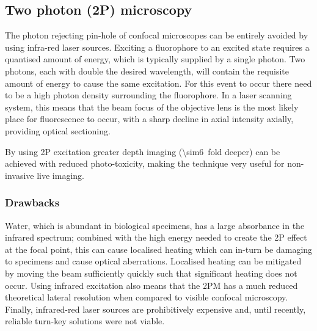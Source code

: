 %

\subsection{Two photon (2P) microscopy}


The photon rejecting pin-hole of confocal microscopes can be entirely avoided by using infra-red laser sources.
Exciting a fluorophore to an excited state requires a quantised amount of energy, which is typically supplied by a single photon.
Two photons, each with double the desired wavelength, will contain the requisite amount of energy to cause the same excitation.
For this event to occur there need to be a high photon density surrounding the fluorophore.
In a laser scanning system, this means that the beam focus of the \gls{objective lens} is the most likely place for fluorescence to occur, with a sharp decline in axial intensity axially, providing optical sectioning.

By using 2P excitation greater depth imaging (\SI{\sim6}{fold} deeper) can be achieved with reduced photo-toxicity, making the technique very useful for non-invasive live imaging.

\subsubsection{Drawbacks}

Water, which is abundant in biological specimens, has a large absorbance in the infrared spectrum; combined with the high energy needed to create the 2P effect at the focal point, this can cause localised heating which can in-turn be damaging to specimens and cause optical aberrations.
Localised heating can be mitigated by moving the beam sufficiently quickly such that significant heating does not occur.
Using infrared excitation also means that the 2PM has a much reduced theoretical lateral resolution when compared to visible confocal microscopy.
Finally, infrared-red laser sources are prohibitively expensive and, until recently, reliable turn-key solutions were not viable.

